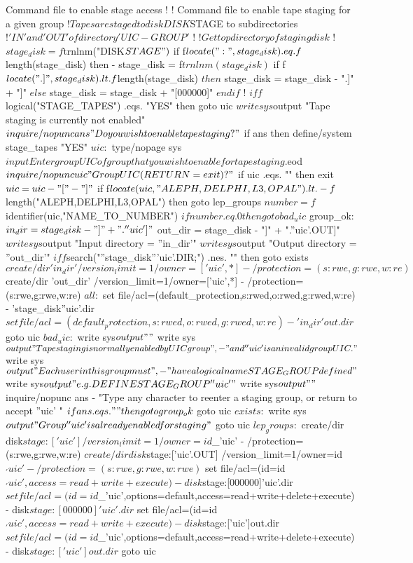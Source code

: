 \begin{XMPt}{Command file to enable stage access}
$ !
$ ! Command file to enable tape staging for a given group
$ ! Tapes are staged to disk DISK$STAGE to subdirectories
$ ! 'IN' and 'OUT' of directory 'UIC-GROUP'
$ !
$ !   Get top directory of staging disk
$ !
$  stage_disk = f$trnlnm("DISK$STAGE")
$  if f$locate(":",stage_disk) .eq. f$length(stage_disk) then -
      stage_disk = f$trnlnm(stage_disk)
$  if f$locate(".]",stage_disk) .lt. f$length(stage_disk)
$     then
$        stage_disk = stage_disk - ".]" + "]"
$     else
$        stage_disk = stage_disk + "[000000]"
$     endif
$ !
$ if f$logical("STAGE_TAPES") .eqs. "YES" then goto uic
$ write sys$output "Tape staging is currently not enabled"
$ inquire/nopunc ans "Do you wish to enable tape staging? "
$ if ans then define/system stage_tapes "YES"
$ uic:
$ type/nopage sys$input

Enter group UIC of group that you wish to enable for tape staging.

$eod
$ inquire/nopunc uic "Group UIC (RETURN=exit)? "
$ if uic .eqs. "" then exit
$ uic = uic - "[" - "]"
$ if f$locate(uic,"ALEPH,DELPHI,L3,OPAL") .lt. -
f$length("ALEPH,DELPHI,L3,OPAL") then goto lep_groups
$ number = f$identifier(uic,"NAME_TO_NUMBER")
$ if number .eq. 0 then goto bad_uic
$ group_ok:
$  in_dir  = stage_disk - "]" + ".''uic']"
$  out_dir = stage_disk - "]" + ".''uic'.OUT]"
$  write sys$output "Input directory  = ''in_dir'"
$  write sys$output "Output directory = ''out_dir'"
$ if f$search("''stage_disk'''uic'.DIR;") .nes. "" then goto exists
$ create/dir 'in_dir' /version_limit=1/owner=['uic',*] -
/protection=(s:rwe,g:rwe,w:re)
$ create/dir 'out_dir' /version_limit=1/owner=['uic',*] -
/protection=(s:rwe,g:rwe,w:re)
$ all:
$ set file/acl=(default_protection,s:rwed,o:rwed,g:rwed,w:re) -
'stage_disk''uic'.dir
$ set file/acl=(default_protection,s:rwed,o:rwed,g:rwed,w:re) -
'in_dir'out.dir
$ goto uic
$ bad_uic:
$ write sys$output ""
$ write sys$output "Tape staging is normally enabled by UIC group ", -
"and ''uic' is an invalid group UIC."
$ write sys$output "Each user in this group must ", -
"have a logical name STAGE_GROUP defined"
$ write sys$output "e.g. DEFINE STAGE_GROUP ''uic'"
$ write sys$output ""
$ inquire/nopunc ans -
"Type any character to reenter a staging group, or return to accept ''uic' "
$ if ans .eqs. "" then goto group_ok
$ goto uic
$ exists:
$ write sys$output "Group ''uic' is already enabled for staging"
$ goto uic
$ lep_groups:
$ create/dir disk$stage:['uic'] /version_limit=1/owner=id$_'uic' -
/protection=(s:rwe,g:rwe,w:re)
$ create/dir disk$stage:['uic'.OUT] /version_limit=1/owner=id$_'uic' -
/protection=(s:rwe,g:rwe,w:rwe)
$ set file/acl=(id=id$_'uic',access=read+write+execute) -
disk$stage:[000000]'uic'.dir
$ set file/acl=(id=id$_'uic',options=default,access=read+write+delete+execute) -
disk$stage:[000000]'uic'.dir
$ set file/acl=(id=id$_'uic',access=read+write+execute) -
disk$stage:['uic']out.dir
$ set file/acl=(id=id$_'uic',options=default,access=read+write+delete+execute) -
disk$stage:['uic']out.dir
$ goto uic
\end{XMPt}

